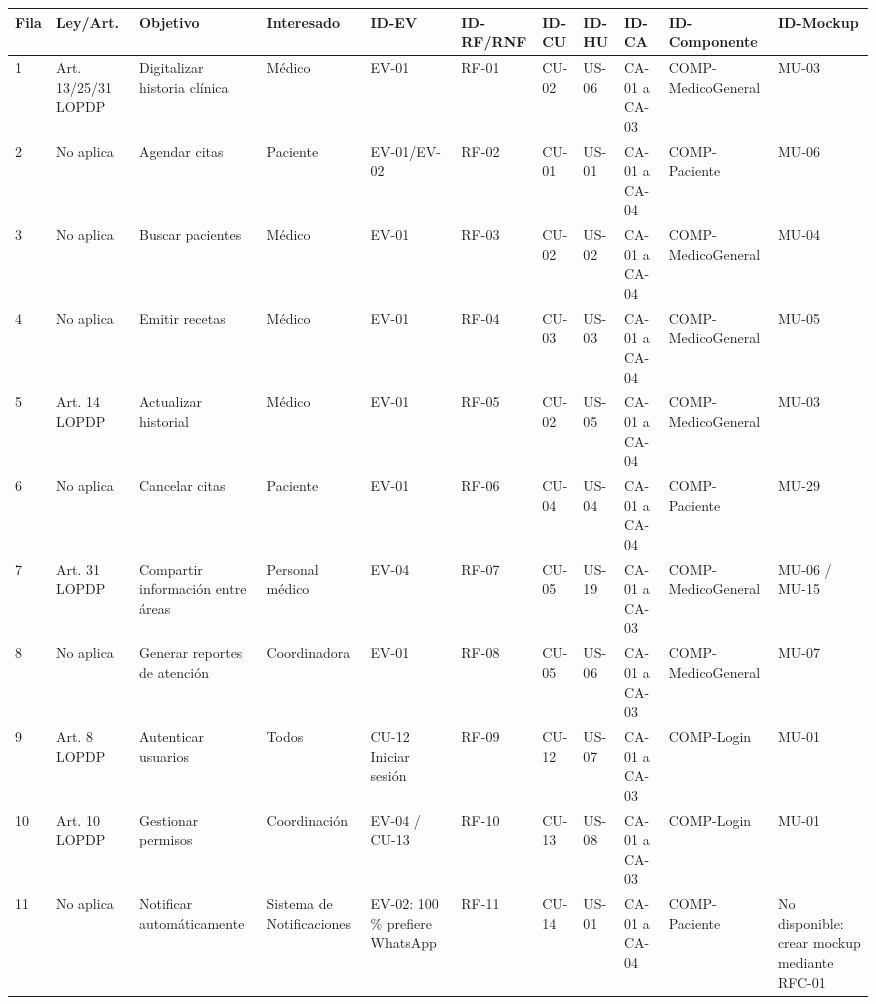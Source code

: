 \documentclass[11pt,a4paper]{article}
\begin{document}
	\begin{longtable}{p{} p{} p{} p{} p{} p{} p{} p{} p{} p{} p{}}
		
		\toprule
		\textbf{Fila} & \textbf{Ley/Art.} & \textbf{Objetivo} & \textbf{Interesado} & \textbf{ID-EV} & \textbf{ID-RF/RNF} & \textbf{ID-CU} & \textbf{ID-HU} & \textbf{ID-CA} & \textbf{ID-Componente} & \textbf{ID-Mockup} \\
		
		\midrule
		\endhead
		
		
		1 & Art. 13/25/31 LOPDP & Digitalizar historia clínica & Médico & EV-01 & RF-01 & CU-02 & US-06 & CA-01 a CA-03 & COMP-MedicoGeneral & MU-03 \\
		2 & No aplica & Agendar citas & Paciente & EV-01/EV-02 & RF-02 & CU-01 & US-01 & CA-01 a CA-04 & COMP-Paciente & MU-06 \\
		3 & No aplica & Buscar pacientes & Médico & EV-01 & RF-03 & CU-02 & US-02 & CA-01 a CA-04 & COMP-MedicoGeneral & MU-04 \\
		4 & No aplica & Emitir recetas & Médico & EV-01 & RF-04 & CU-03 & US-03 & CA-01 a CA-04 & COMP-MedicoGeneral & MU-05 \\
		5 & Art. 14 LOPDP & Actualizar historial & Médico & EV-01 & RF-05 & CU-02 & US-05 & CA-01 a CA-04 & COMP-MedicoGeneral & MU-03 \\
		6 & No aplica & Cancelar citas & Paciente & EV-01 & RF-06 & CU-04 & US-04 & CA-01 a CA-04 & COMP-Paciente & MU-29  \\
		7 & Art. 31 LOPDP & Compartir información entre áreas & Personal médico & EV-04 & RF-07 & CU-05 & US-19 & CA-01 a CA-03 & COMP-MedicoGeneral & MU-06 / MU-15 \\
		8 & No aplica & Generar reportes de atención & Coordinadora & EV-01 & RF-08 & CU-05 & US-06 & CA-01 a CA-03 & COMP-MedicoGeneral & MU-07 \\
		9 & Art. 8 LOPDP & Autenticar usuarios & Todos & CU-12 Iniciar sesión & RF-09 & CU-12 & US-07 & CA-01 a CA-03 & COMP-Login & MU-01 \\
		10 & Art. 10 LOPDP & Gestionar permisos & Coordinación & EV-04 / CU-13 & RF-10 & CU-13 & US-08 & CA-01 a CA-03 & COMP-Login & MU-01 \\
		11 & No aplica & Notificar automáticamente & Sistema de Notificaciones & EV-02: 100\,\% prefiere WhatsApp & RF-11 & CU-14 & US-01 & CA-01 a CA-04 & COMP-Paciente & No disponible: crear mockup mediante RFC-01 \\

\end{longtable}
\end{document}

